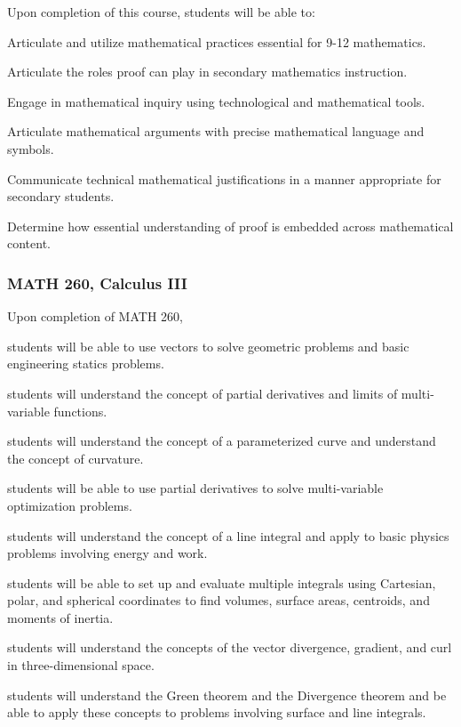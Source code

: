 Upon completion of this course, students will be able to:
\begin{alphalist}
\item Articulate and utilize mathematical practices essential for 9-12 mathematics.  
\item Articulate the roles proof can play in secondary mathematics instruction.
\item Engage in mathematical inquiry using technological and mathematical tools.
\item Articulate mathematical arguments with precise mathematical language and symbols.
\item Communicate technical mathematical justifications in a manner appropriate for secondary students.
\item Determine how essential understanding of proof is embedded across mathematical content.
\end{alphalist}

\subsubsection*{MATH 260, Calculus III}


Upon completion of MATH 260,
\begin{alphalist} 
    \item students will be able to use vectors to solve geometric problems and basic engineering statics problems.
    \item students will understand the concept of partial derivatives and limits of multi-variable functions.
    \item students will understand the concept of a parameterized curve and understand the concept of curvature.
    \item students will be able to use partial derivatives to solve multi-variable optimization problems.
    \item students will understand the concept of a line integral and apply to basic physics problems involving energy and work.
    \item students will be able to set up and evaluate multiple integrals using Cartesian, polar, and spherical coordinates to find volumes, surface areas, centroids, and moments of inertia.
    \item students will understand the concepts of the vector divergence, gradient, and curl in three-dimensional space.
    \item students will understand the Green theorem and the Divergence theorem and be able to apply these concepts to problems involving surface and line integrals.
\end{alphalist}

